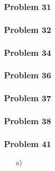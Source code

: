 \documentclass[a4paper,12pt]{article}
\begin{document}
\subsubsection*{Problem 31}
\subsubsection*{Problem 32}
\subsubsection*{Problem 34}
\subsubsection*{Problem 36}
\subsubsection*{Problem 37}
\subsubsection*{Problem 38}
\subsubsection*{Problem 41}
\begin{itemize}
    \item [a)]
\end{itemize}
\end{document}
